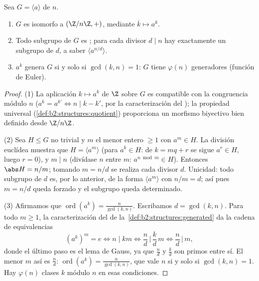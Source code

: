 \begin{proposition}\label{prop:b2:structures:cyclic}
Sea $G = \langle a \rangle$  de  $n$.
\begin{enumerate}
  \item $G$ es isomorfo a $(\Z/n\Z, +)$, mediante $\overline k \mapsto
        a^k$.
  \item Todo subgrupo de $G$ es ; para cada divisor $d \mid n$
        hay exactamente un subgrupo de  $d$, a saber $\langle
        a^{n/d}\rangle$.
  \item $a^k$ genera $G$ si y solo si $\gcd(k, n) = 1$: $G$ tiene
        $\varphi(n)$ generadores (función de Euler).
\end{enumerate}
\end{proposition}

\begin{proof}
(1) La aplicación $k \mapsto a^k$ de $\Z$ sobre $G$ es compatible con
la congruencia módulo $n$ ($a^{k} = a^{k'} \iff n \mid k - k'$, por
la caracterización del ); la propiedad universal
(\cref{def:b2:structures:quotient}) proporciona un morfismo biyectivo
bien definido desde $\Z/n\Z$.

(2) Sea $H \leq G$ no trivial y $m$ el menor entero $\geq 1$ con $a^m
\in H$. La división euclídea muestra que $H = \langle a^m\rangle$
(para $a^k \in H$: de $k = mq + r$ se sigue $a^r \in H$, luego $r =
0$), y $m \mid n$ (divídase $n$ entre $m$: $a^{n \bmod m} \in H$).
Entonces $\abs H = n/m$; tomando $m = n/d$ se realiza cada divisor
$d$. Unicidad: todo subgrupo de  $d$ es, por lo anterior, de la
forma $\langle a^m \rangle$ con $n/m = d$; así pues $m = n/d$ queda
forzado y el subgrupo queda determinado.

(3) Afirmamos que $\operatorname{ord}(a^k) = \frac{n}{\gcd(k, n)}$.
Escribamos $d = \gcd(k, n)$. Para todo $m \geq 1$, la
caracterización del  de la~\cref{def:b2:structures:generated} da
la cadena de equivalencias
\[
(a^k)^m = e
\iff n \mid km
\iff \frac{n}{d} \,\Big|\, \frac{k}{d}\,m
\iff \frac{n}{d} \,\Big|\, m ,
\]
donde el último paso es el lema de Gauss, ya que $\frac nd$ y
$\frac kd$ son primos entre sí. El menor $m$ así es $\frac nd$:
$\operatorname{ord}(a^k) = \frac n{\gcd(k,n)}$, que vale $n$ si y
solo si $\gcd(k, n) = 1$. Hay $\varphi(n)$ clases $k$ módulo $n$
en esas condiciones.
\end{proof}

